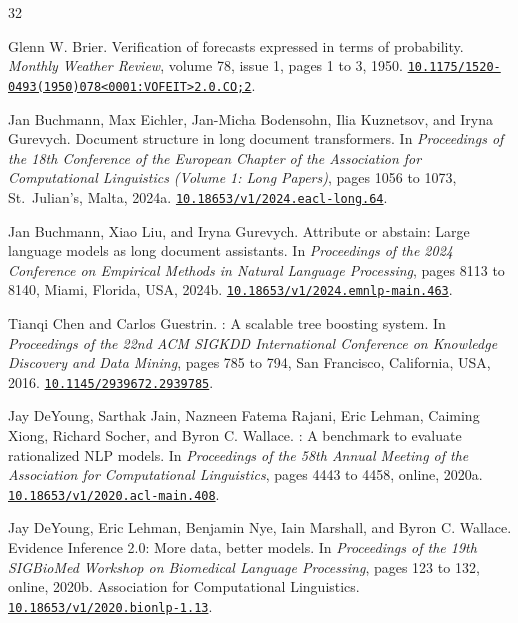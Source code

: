 \documentclass[11pt,letterpaper]{article}
\newcommand{\doi}[1]{\href{https://doi.org/#1}{\nolinkurl{#1}}}
\begin{document}
\begin{thebibliography}{32}
\providecommand{\natexlab}[1]{#1}

Glenn W. Brier.
\newblock Verification of forecasts expressed in terms of probability.
\newblock \emph{Monthly Weather Review}, volume 78, issue 1, pages 1 to 3, 1950.
\newblock \doi{10.1175/1520-0493(1950)078<0001:VOFEIT>2.0.CO;2}.

Jan Buchmann, Max Eichler, Jan-Micha Bodensohn, Ilia Kuznetsov, and Iryna Gurevych.
\newblock Document structure in long document transformers.
\newblock In \emph{Proceedings of the 18th Conference of the European Chapter of the Association for Computational Linguistics (Volume 1: Long Papers)}, pages 1056 to 1073, St.\ Julian's, Malta, 2024a.
\newblock \doi{10.18653/v1/2024.eacl-long.64}.

Jan Buchmann, Xiao Liu, and Iryna Gurevych.
\newblock Attribute or abstain: Large language models as long document assistants.
\newblock In \emph{Proceedings of the 2024 Conference on Empirical Methods in Natural Language Processing}, pages 8113 to 8140, Miami, Florida, USA, 2024b.
\newblock \doi{10.18653/v1/2024.emnlp-main.463}.

Tianqi Chen and Carlos Guestrin.
: A scalable tree boosting system.
\newblock In \emph{Proceedings of the 22nd ACM SIGKDD International Conference on Knowledge Discovery and Data Mining}, pages 785 to 794, San Francisco, California, USA, 2016.
\newblock \doi{10.1145/2939672.2939785}.

Jay DeYoung, Sarthak Jain, Nazneen Fatema Rajani, Eric Lehman, Caiming Xiong, Richard Socher, and Byron C. Wallace.
: A benchmark to evaluate rationalized {NLP} models.
\newblock In \emph{Proceedings of the 58th Annual Meeting of the Association for Computational Linguistics}, pages 4443 to 4458, online, 2020a.
\newblock \doi{10.18653/v1/2020.acl-main.408}.

Jay DeYoung, Eric Lehman, Benjamin Nye, Iain Marshall, and Byron C. Wallace.
\newblock Evidence Inference 2.0: More data, better models.
\newblock In \emph{Proceedings of the 19th SIGBioMed Workshop on Biomedical Language Processing}, pages 123 to 132, online, 2020b. Association for Computational Linguistics.
\newblock \doi{10.18653/v1/2020.bionlp-1.13}.


\end{thebibliography}
\end{document}
